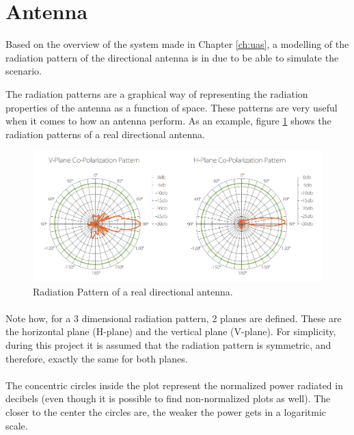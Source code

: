 \section{Antenna}\label{sec:antenna}

Based on the overview of the system made in Chapter \ref{ch:uas}, a modelling of the radiation pattern of the directional antenna is in due to be able to simulate the scenario.

The radiation patterns are a graphical way of representing the radiation properties of the antenna as a function of space. These patterns are very useful when it comes to how an antenna perform. As an example, figure \ref{fig:radpattern} shows the radiation patterns of a real directional antenna.

\begin{figure}[H]
	\centerline{
	\includegraphics[scale=0.5]{figures/radpattern.png}}
	\caption{Radiation Pattern of a real directional antenna.}
	\label{fig:radpattern}
\end{figure}

\paragraph{}Note how, for a 3 dimensional radiation pattern, 2 planes are defined. These are the horizontal plane (H-plane) and the vertical plane (V-plane). For simplicity, during this project it is assumed that the radiation pattern is symmetric, and therefore, exactly the same for both planes.

\paragraph{}The concentric circles inside the plot represent the normalized power radiated in decibels (even though it is possible to find non-normalized plots as well). The closer to the center the circles are, the weaker the power gets in a logaritmic scale. 

